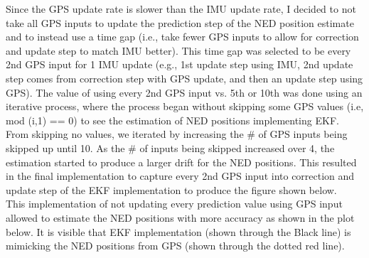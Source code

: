 Since the GPS update rate is slower than the IMU update rate, I decided to not take all GPS inputs to update the prediction step of the NED position estimate and to instead use a time gap (i.e., take fewer GPS inputs to allow for correction and update step to match IMU better). This time gap was selected to be every 2nd GPS input for 1 IMU update (e.g., 1st update step using IMU, 2nd update step comes from correction step with GPS update, and then an update step using GPS). The value of using every 2nd GPS input vs. 5th or 10th was done using an iterative process, where the process began without skipping some GPS values (i.e, mod (i,1) == 0) to see the estimation of NED positions implementing EKF. From skipping no values, we iterated by increasing the # of GPS inputs being skipped up until 10. As the # of inputs being skipped increased over 4, the estimation started to produce a larger drift for the NED positions. This resulted in the final implementation to capture every 2nd GPS input into correction and update step of the EKF implementation to produce the figure shown below.\\
This implementation of not updating every prediction value using GPS input allowed to estimate the NED positions with more accuracy as shown in the plot below. It is visible that EKF implementation (shown through the Black line) is mimicking the NED positions from GPS (shown through the dotted red line). 

